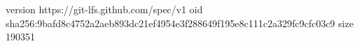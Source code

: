 version https://git-lfs.github.com/spec/v1
oid sha256:9bafd8c4752a2aeb893dc21ef4954e3f288649f195e8c111c2a329fc9cfc03c9
size 190351
